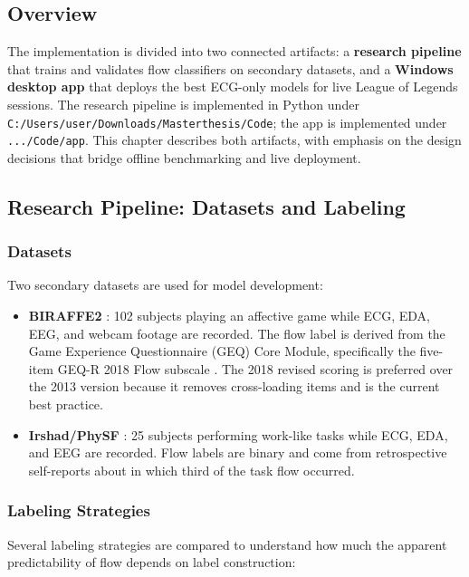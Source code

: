 \subsection{Overview}

The implementation is divided into two connected artifacts: a \textbf{research pipeline} that trains and validates flow classifiers on secondary datasets, and a \textbf{Windows desktop app} that deploys the best ECG-only models for live League of Legends sessions. The research pipeline is implemented in Python under \texttt{C:/Users/user/Downloads/Masterthesis/Code}; the app is implemented under \texttt{.../Code/app}. This chapter describes both artifacts, with emphasis on the design decisions that bridge offline benchmarking and live deployment.

\subsection{Research Pipeline: Datasets and Labeling}

\subsubsection{Datasets}

Two secondary datasets are used for model development:

\begin{itemize}
    \item \textbf{BIRAFFE2} \autocite{kutt2022biraffe2}: 102 subjects playing an affective game while ECG, EDA, EEG, and webcam footage are recorded. The flow label is derived from the Game Experience Questionnaire (GEQ) Core Module, specifically the five-item GEQ-R 2018 Flow subscale \autocite{ijsselsteijn2013game}. The 2018 revised scoring is preferred over the 2013 version because it removes cross-loading items and is the current best practice.
    \item \textbf{Irshad/PhySF} \autocite{irshad2023wearable}: 25 subjects performing work-like tasks while ECG, EDA, and EEG are recorded. Flow labels are binary and come from retrospective self-reports about in which third of the task flow occurred.
\end{itemize}

\subsubsection{Labeling Strategies}

Several labeling strategies are compared to understand how much the apparent predictability of flow depends on label construction:

